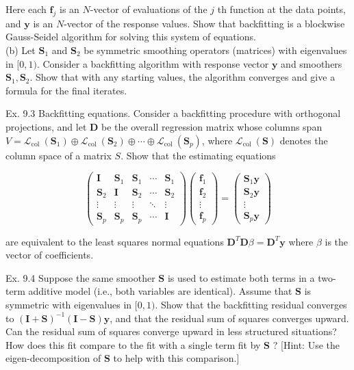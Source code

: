 \documentclass[10pt]{article}
\begin{document}
Here each $\mathbf{f}_{j}$ is an $N$-vector of evaluations of the $j$ th function at the data points, and $\mathbf{y}$ is an $N$-vector of the response values. Show that backfitting is a blockwise Gauss-Seidel algorithm for solving this system of equations.\\
(b) Let $\mathbf{S}_{1}$ and $\mathbf{S}_{2}$ be symmetric smoothing operators (matrices) with eigenvalues in $[0,1)$. Consider a backfitting algorithm with response vector $\mathbf{y}$ and smoothers $\mathbf{S}_{1}, \mathbf{S}_{2}$. Show that with any starting values, the algorithm converges and give a formula for the final iterates.

Ex. 9.3 Backfitting equations. Consider a backfitting procedure with orthogonal projections, and let $\mathbf{D}$ be the overall regression matrix whose columns span $V=\mathcal{L}_{\text {col }}\left(\mathbf{S}_{1}\right) \oplus \mathcal{L}_{\text {col }}\left(\mathbf{S}_{2}\right) \oplus \cdots \oplus \mathcal{L}_{\text {col }}\left(\mathbf{S}_{p}\right)$, where $\mathcal{L}_{\text {col }}(\mathbf{S})$ denotes the column space of a matrix $S$. Show that the estimating equations

$$
\left(\begin{array}{ccccc}
\mathbf{I} & \mathbf{S}_{1} & \mathbf{S}_{1} & \cdots & \mathbf{S}_{1} \\
\mathbf{S}_{2} & \mathbf{I} & \mathbf{S}_{2} & \cdots & \mathbf{S}_{2} \\
\vdots & \vdots & \vdots & \ddots & \vdots \\
\mathbf{S}_{p} & \mathbf{S}_{p} & \mathbf{S}_{p} & \cdots & \mathbf{I}
\end{array}\right)\left(\begin{array}{c}
\mathbf{f}_{1} \\
\mathbf{f}_{2} \\
\vdots \\
\mathbf{f}_{p}
\end{array}\right)=\left(\begin{array}{c}
\mathbf{S}_{1} \mathbf{y} \\
\mathbf{S}_{2} \mathbf{y} \\
\vdots \\
\mathbf{S}_{p} \mathbf{y}
\end{array}\right)
$$

are equivalent to the least squares normal equations $\mathbf{D}^{T} \mathbf{D} \beta=\mathbf{D}^{T} \mathbf{y}$ where $\beta$ is the vector of coefficients.

Ex. 9.4 Suppose the same smoother $\mathbf{S}$ is used to estimate both terms in a two-term additive model (i.e., both variables are identical). Assume that $\mathbf{S}$ is symmetric with eigenvalues in $[0,1)$. Show that the backfitting residual converges to $(\mathbf{I}+\mathbf{S})^{-1}(\mathbf{I}-\mathbf{S}) \mathbf{y}$, and that the residual sum of squares converges upward. Can the residual sum of squares converge upward in less structured situations? How does this fit compare to the fit with a single term fit by $\mathbf{S}$ ? [Hint: Use the eigen-decomposition of $\mathbf{S}$ to help with this comparison.]
\end{document}
